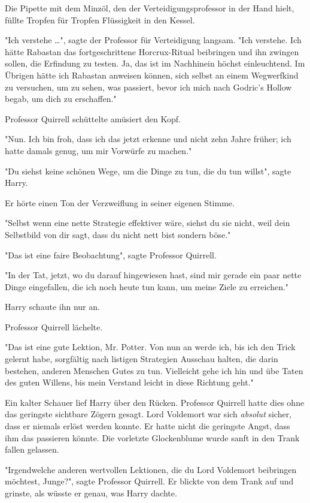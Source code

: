 {Die Pipette mit dem Minzöl, den der Verteidigungsprofessor in der Hand hielt, füllte Tropfen für Tropfen Flüssigkeit in den Kessel.

"Ich verstehe …", sagte der Professor für Verteidigung langsam. "Ich verstehe. Ich hätte Rabastan das fortgeschrittene Horcrux-Ritual beibringen und ihn zwingen sollen, die Erfindung zu testen. Ja, das ist im Nachhinein höchst einleuchtend. Im Übrigen hätte ich Rabastan anweisen können, sich selbst an einem Wegwerfkind zu versuchen, um zu sehen, was passiert, bevor ich mich nach Godric's Hollow begab, um dich zu erschaffen."

Professor Quirrell schüttelte amüsiert den Kopf.

"Nun. Ich bin froh, dass ich das jetzt erkenne und nicht zehn Jahre früher; ich hatte damals genug, um mir Vorwürfe zu machen."

"Du siehst keine schönen Wege, um die Dinge zu tun, die du tun willst", sagte Harry.

Er hörte einen Ton der Verzweiflung in seiner eigenen Stimme.

"Selbst wenn eine nette Strategie effektiver wäre, siehst du sie nicht, weil dein Selbstbild von dir sagt, dass du nicht nett bist sondern böse."

"Das ist eine faire Beobachtung", sagte Professor Quirrell.

"In der Tat, jetzt, wo du darauf hingewiesen hast, sind mir gerade ein paar nette Dinge eingefallen, die ich noch heute tun kann, um meine Ziele zu erreichen."

Harry schaute ihn nur an.

Professor Quirrell lächelte.

"Das ist eine gute Lektion, Mr. Potter. Von nun an werde ich, bis ich den Trick gelernt habe, sorgfältig nach listigen Strategien Ausschau halten, die darin bestehen, anderen Menschen Gutes zu tun. Vielleicht gehe ich hin und übe Taten des guten Willens, bis mein Verstand leicht in diese Richtung geht."

Ein kalter Schauer lief Harry über den Rücken. Professor Quirrell hatte dies ohne das geringste sichtbare Zögern gesagt. Lord Voldemort war sich \emph{absolut} sicher, dass er niemals erlöst werden konnte. Er hatte nicht die geringste Angst, dass ihm das passieren könnte. Die vorletzte Glockenblume wurde sanft in den Trank fallen gelassen.

"Irgendwelche anderen wertvollen Lektionen, die du Lord Voldemort beibringen möchtest, Junge?", sagte Professor Quirrell. Er blickte von dem Trank auf und grinste, als wüsste er genau, was Harry dachte.

}
